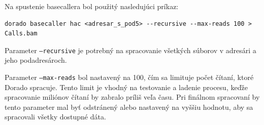 Na spustenie basecallera bol použitý nasledujúci príkaz:
\begin{verbatim}
dorado basecaller hac <adresar_s_pod5> --recursive --max-reads 100 > Calls.bam
\end{verbatim}

Parameter \texttt{--recursive} je potrebný na spracovanie všetkých súborov v adresári a jeho podadresároch.

Parameter \texttt{--max-reads} bol nastavený na 100, čím sa limituje počet čítaní, ktoré Dorado spracuje. Tento limit je vhodný na testovanie a ladenie procesu, keďže spracovanie miliónov čítaní by zabralo príliš veľa času. Pri finálnom spracovaní by tento parameter mal byť odstránený alebo nastavený na vyššiu hodnotu, aby sa spracovali všetky dostupné dáta.
\cite{DoradoDocs}
